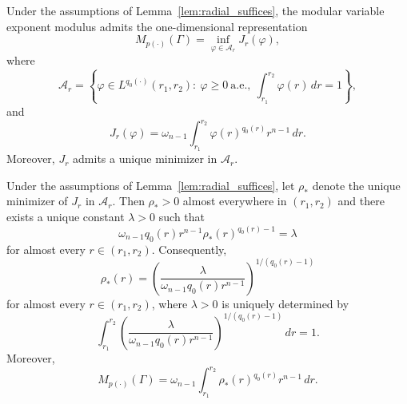 \documentclass[10pt,a4paper]{amsart}
\begin{document}
\begin{theorem}
\label{thm:1d_modulus}
Under the assumptions of Lemma~\ref{lem:radial_suffices}, the modular
variable exponent modulus admits the one-dimensional representation
\begin{equation}
\label{eq:annulus_1d_reduction}
M_{p(\cdot)}(\Gamma)
=
\inf_{\varphi\in\mathcal A_r} J_r(\varphi),
\end{equation}
where
\begin{equation}
\label{eq:annulus_admissible_class}
\mathcal A_r
=
\left\{
\varphi\in L^{q_0(\cdot)}(r_1,r_2):
\ \varphi\ge0\ \text{a.e.},\
\int_{r_1}^{r_2}\varphi(r)\,dr=1
\right\},
\end{equation}
and
\begin{equation}
\label{eq:annulus_1d_energy}
J_r(\varphi)
=
\omega_{n-1}
\int_{r_1}^{r_2}
\varphi(r)^{q_0(r)}r^{n-1}\,dr.
\end{equation}
Moreover, $J_r$ admits a unique minimizer in $\mathcal A_r$.
\end{theorem}

\begin{theorem}
\label{thm:annulus_formula}
Under the assumptions of Lemma~\ref{lem:radial_suffices}, let
$\rho_*$ denote the unique minimizer of $J_r$ in $\mathcal A_r$.
Then $\rho_*>0$ almost everywhere in $(r_1,r_2)$ and there exists a
unique constant $\lambda>0$ such that
\begin{equation}
\label{eq:annulus_EL}
\omega_{n-1}q_0(r)r^{n-1}
\rho_*(r)^{q_0(r)-1}
=
\lambda
\end{equation}
for almost every $r\in(r_1,r_2)$.
Consequently,
\begin{equation}
\label{eq:annulus_extr}
\rho_*(r)
=
\left(
\frac{\lambda}
{\omega_{n-1}q_0(r)r^{n-1}}
\right)^{\!1/(q_0(r)-1)}
\end{equation}
for almost every $r\in(r_1,r_2)$,
where $\lambda>0$ is uniquely determined by
\begin{equation}
\label{eq:annulus_normalization}
\int_{r_1}^{r_2}
\left(
\frac{\lambda}
{\omega_{n-1}q_0(r)r^{n-1}}
\right)^{\!1/(q_0(r)-1)}
\,dr
=
1.
\end{equation}
Moreover,
\begin{equation}
\label{eq:annulus_modulus_formula}
M_{p(\cdot)}(\Gamma)
=
\omega_{n-1}
\int_{r_1}^{r_2}
\rho_*(r)^{q_0(r)}r^{n-1}\,dr.
\end{equation}
\end{theorem}
\end{document}
